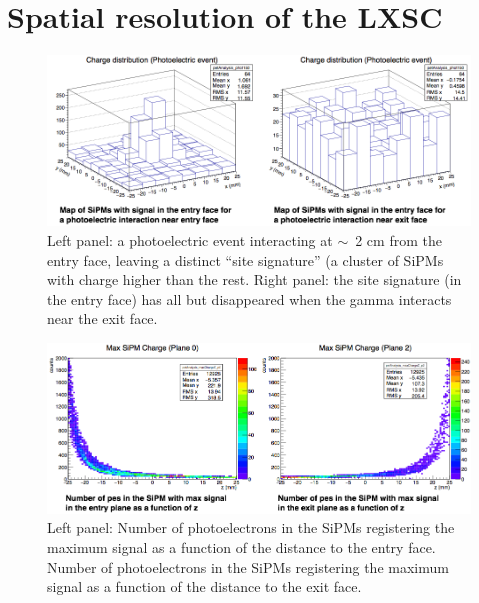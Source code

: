 \documentclass{JINST}
\begin{document}
\section{Spatial resolution of the LXSC}

\begin{figure}[!htb]
	\centering
	\includegraphics[scale=0.4]{img/zEvents.png}
	\caption{\label{fig.ze}  Left panel: a photoelectric event interacting at $\sim$~2 cm from the entry face, leaving a distinct ``site signature'' (a cluster of SiPMs with charge higher than the rest. Right panel: the site signature (in the entry face) has all but disappeared when the gamma interacts near the exit face.}
\end{figure}

\begin{figure}[!htb]
	\centering
	\includegraphics[scale=0.4]{img/SiPMMax.png}
	\caption{\label{fig.sipmm}  Left panel: Number of photoelectrons in the SiPMs registering the maximum signal as a function of the distance to the entry face. Number of photoelectrons in the SiPMs registering the maximum signal as a function of the distance to the exit face.}
\end{figure}
\end{document}
